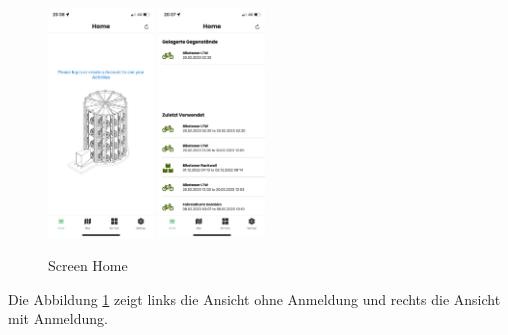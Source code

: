 \begin{figure}[H]
    \centering
    \includegraphics[width=0.25\textwidth]{images/app-screenshots/screenhomeno.png}
    \includegraphics[width=0.25\textwidth]{images/app-screenshots/screenhomeyes.png}
    \caption{Screen Home}
    \label{fig:screenhome}
\end{figure}
Die Abbildung \ref{fig:screenhome} zeigt links die Ansicht ohne Anmeldung und rechts die Ansicht mit Anmeldung.


